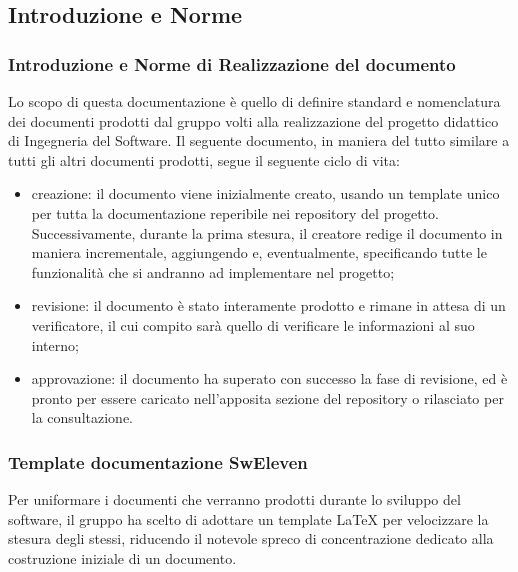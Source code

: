 \subsection{Introduzione e Norme}
\subsubsection{Introduzione e Norme di Realizzazione del documento}
Lo scopo di questa documentazione è quello di definire standard e nomenclatura dei documenti prodotti dal gruppo {\Gruppo}  volti alla realizzazione del progetto didattico di Ingegneria del Software.
Il seguente documento, in maniera del tutto similare a tutti gli altri documenti prodotti, segue il seguente ciclo di vita:
\begin{itemize}
\item creazione: il documento viene inizialmente creato, usando un template unico per tutta la documentazione reperibile nei repository del progetto. Successivamente, durante la prima stesura, il creatore redige il documento in maniera incrementale, aggiungendo e, eventualmente, specificando tutte le funzionalità che si andranno ad implementare nel progetto;
\item revisione: il documento è stato interamente prodotto e rimane in attesa di un verificatore, il cui compito sarà quello di verificare le informazioni al suo interno;
\item approvazione: il documento ha superato con successo la fase di revisione, ed è pronto per essere caricato nell’apposita sezione del repository o rilasciato per la consultazione.
\end{itemize}
\subsubsection{Template documentazione SwEleven}
Per uniformare i documenti che verranno prodotti durante lo sviluppo del software, il gruppo ha scelto di adottare un template \LaTeX{} per velocizzare la stesura degli stessi, riducendo il notevole spreco di concentrazione dedicato alla costruzione iniziale di un documento.